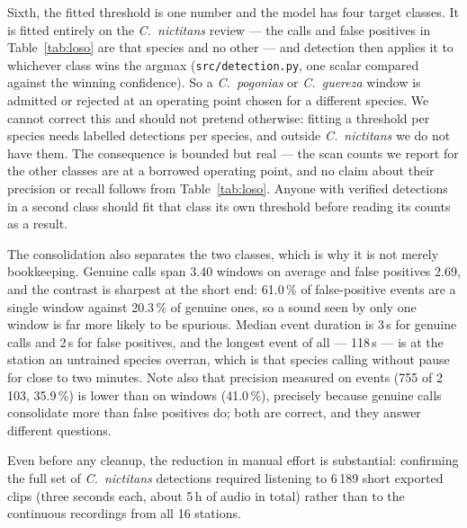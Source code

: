 \documentclass[review,3p,times]{elsarticle}
\begin{document}
Sixth, the fitted threshold is one number and the model has four target classes.
It is fitted entirely on the \textit{C.\ nictitans} review --- the calls and
false positives in Table~\ref{tab:loso} are that species and no other --- and
detection then applies it to whichever class wins the argmax
(\texttt{src/detection.py}, one scalar compared against the winning
confidence). So a \textit{C.\ pogonias} or \textit{C.\ guereza} window is
admitted or rejected at an operating point chosen for a different species. We
cannot correct this and should not pretend otherwise: fitting a threshold per
species needs labelled detections per species, and outside \textit{C.\ nictitans}
we do not have them. The consequence is bounded but real --- the scan counts we
report for the other classes are at a borrowed operating point, and no claim
about their precision or recall follows from Table~\ref{tab:loso}. Anyone with
verified detections in a second class should fit that class its own threshold
before reading its counts as a result.

The consolidation also separates the two classes, which is why it is not merely
bookkeeping. Genuine calls span 3.40 windows on average and false positives
2.69, and the contrast is sharpest at the short end: 61.0\,\% of false-positive
events are a single window against 20.3\,\% of genuine ones, so a sound seen by
only one window is far more likely to be spurious. Median event duration is 3\,s
for genuine calls and 2\,s for false positives, and the longest event of all ---
118\,s --- is at the station an untrained species overran, which is that
species calling without pause for close to two minutes. Note also that precision
measured on events (755 of 2\,103, 35.9\,\%) is lower than on windows
(41.0\,\%), precisely because genuine calls consolidate more than false
positives do; both are correct, and they answer different questions.

Even before any cleanup, the reduction in manual effort is substantial:
confirming the full set of \textit{C.\ nictitans} detections required listening
to 6\,189 short exported clips (three seconds each, about 5\,h of audio in
total) rather than to the continuous recordings from all 16 stations.
\end{document}
